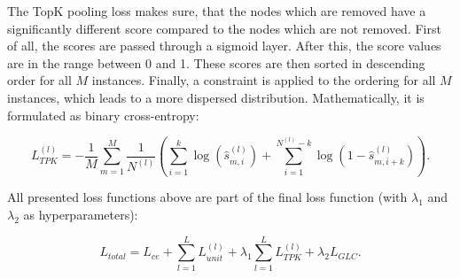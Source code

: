 The TopK pooling loss makes sure, that the nodes which are removed have a significantly different score compared to the nodes which are not removed. 
First of all, the scores are passed through a sigmoid layer. After this, the score values are in the range between 0 and 1. These scores are then sorted in descending order for all $M$ instances. Finally, a constraint is applied to the ordering for all $M$ instances, which leads to a more dispersed distribution. 
Mathematically, it is formulated as binary cross-entropy:

\begin{equation}\label{eq:loss_tpk}
L_{TPK}^{(l)} = - \frac{1}{M} \sum_{m=1}^{M} \frac{1}{N^{(l)}} \left(\sum_{i=1}^{k} \log(\hat{s}_{m, i}^{(l)}) + \sum_{i=1}^{N^{(l)}-k} \log (1- \hat{s}_{m, i+k}^{(l)})\right).
\end{equation}

All presented loss functions above are part of the final loss function (with $\lambda_1$ and $\lambda_2$ as hyperparameters):

\begin{equation}\label{eq:loss_total}
L_{total} = L_{ce} + \sum_{l=1}^{L} L_{unit}^{(l)} + \lambda_1 \sum_{l=1}^{L} L_{TPK}^{(l)} + \lambda_2 L_{GLC}.
\end{equation}
